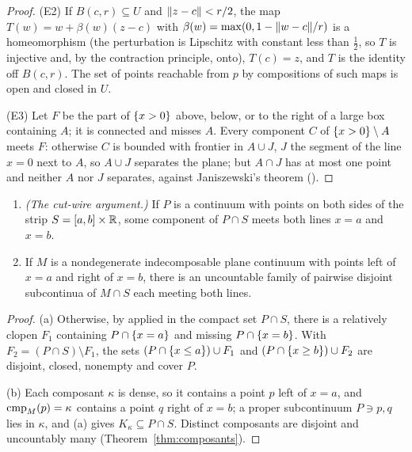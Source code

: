 \begin{proof}
(E2) If $B(c,r)\subseteq U$ and $\lVert z-c\rVert<r/2$, the map $T(w)=w+\beta(w)(z-c)$ with $\beta(w)=\max(0,1-\lVert w-c\rVert/r)$ is a homeomorphism (the perturbation is
Lipschitz with constant less than $\frac12$, so $T$ is injective and, by the contraction principle, onto), $T(c)=z$, and $T$ is the identity off
$B(c,r)$. The set of points reachable from $p$ by compositions of such maps is open and closed in $U$.

(E3) Let $F$ be the part of $\left\{ x>0 \right\}$ above, below, or to the right of a large box containing $A$; it is connected and misses $A$. Every component
$C$ of $\left\{ x>0 \right\}\setminus A$ meets $F$: otherwise $C$ is bounded with frontier in $A\cup J$, $J$ the segment of the line $x=0$ next to $A$, so $A\cup J$
separates the plane; but $A\cap J$ has at most one point and neither $A$ nor $J$ separates, against Janiszewski's theorem ().
\end{proof}


\begin{lemma}\label{lem:crossing}
\leavevmode
\begin{enumerate}[label=(\alph*)]
\item \emph{(The cut-wire argument.)} If $P$ is a continuum with points on both sides of the strip $S=[a,b]\times\mathbb{R}$, some component of $P\cap S$ meets
both lines $x=a$ and $x=b$.
\item If $M$ is a nondegenerate indecomposable plane continuum with points left of $x=a$ and right of $x=b$, there is an uncountable family of
pairwise disjoint subcontinua of $M\cap S$ each meeting both lines.
\end{enumerate}
\end{lemma}

\begin{proof}
(a) Otherwise, by  applied in the compact set $P\cap S$, there is a relatively clopen $F_1$ containing $P\cap\left\{ x=a \right\}$ and missing
$P\cap\left\{ x=b \right\}$. With $F_2=(P\cap S)\setminus F_1$, the sets $(P\cap\left\{ x\le a \right\})\cup F_1$ and $(P\cap\left\{ x\ge b \right\})\cup F_2$ are disjoint, closed, nonempty and
cover $P$.

(b) Each composant $\kappa$ is dense, so it contains a point $p$ left of $x=a$, and $\operatorname{cmp}_{M}(p)=\kappa$ contains a point $q$ right of $x=b$; a proper subcontinuum
$P\ni p,q$ lies in $\kappa$, and (a) gives $K_\kappa\subseteq P\cap S$. Distinct composants are disjoint and uncountably many
(Theorem~\ref{thm:composants}).
\end{proof}

